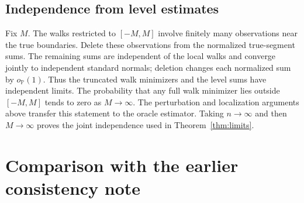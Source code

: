 \documentclass[pdflatex,sn-mathphys-num]{sn-jnl}
\newcommand{\Prob}{\mathbb P}
\newcommand{\op}{o_{\Prob}}
\theoremstyle{thmstyleone}
\theoremstyle{thmstyletwo}
\begin{document}
\subsection{Independence from level estimates}
Fix $M$. The walks restricted to $[-M,M]$ involve finitely many observations
near the true boundaries. Delete these observations from the normalized
true-segment sums. The remaining sums are independent of the local walks
and converge jointly to independent standard normals; deletion changes each
normalized sum by $\op(1)$. Thus the truncated walk minimizers and the
level sums have independent limits. The probability that any full walk
minimizer lies outside $[-M,M]$ tends to zero as $M\to\infty$.
The perturbation and localization arguments above transfer this statement
to the oracle estimator. Taking $n\to\infty$ and then $M\to\infty$ proves
the joint independence used in Theorem~\ref{thm:limits}.

\section{Comparison with the earlier consistency note}\label{app:comparison}
\end{document}
